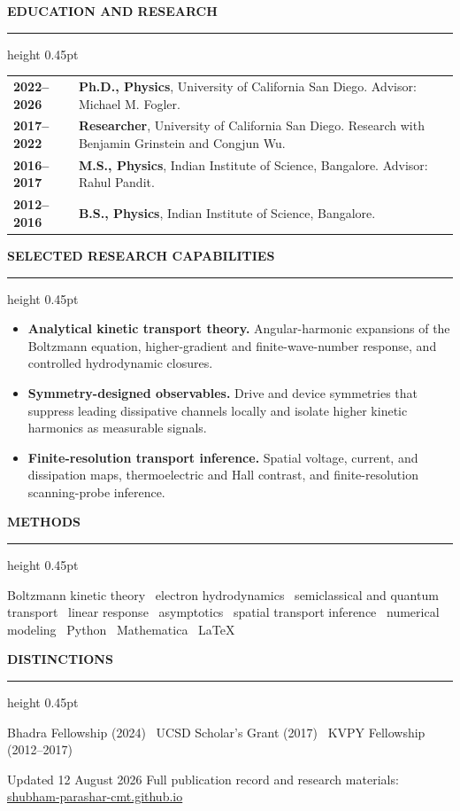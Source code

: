 \documentclass[10.5pt,a4paper]{article}
\newcommand{\sans}[1]{{\sffamily #1}}
\newcommand{\cvsection}[1]{%
  \vspace{11.5pt}%
  {\sans{\fontsize{9.1}{10}\selectfont\bfseries\color{accent}\MakeUppercase{#1}}}\par
  \vspace{2.4pt}\color{rule}\hrule height 0.45pt\color{ink}\vspace{5.4pt}
}
\begin{document}
\cvsection{Education and research}
\begin{tabularx}{\textwidth}{@{}>{\sffamily\bfseries}p{20mm} X@{}}
2022--2026 & \textbf{Ph.D., Physics}, University of California San Diego. Advisor: Michael M. Fogler.\\[3.4pt]
2017--2022 & \textbf{Researcher}, University of California San Diego. Research with Benjamin Grinstein and Congjun Wu.\\[3.4pt]
2016--2017 & \textbf{M.S., Physics}, Indian Institute of Science, Bangalore. Advisor: Rahul Pandit.\\[3.4pt]
2012--2016 & \textbf{B.S., Physics}, Indian Institute of Science, Bangalore.\\
\end{tabularx}

\cvsection{Selected research capabilities}
\begin{itemize}[leftmargin=1.15em,itemsep=6.0pt,topsep=0pt,parsep=0pt]
  \item \textbf{Analytical kinetic transport theory.} Angular-harmonic expansions of the Boltzmann equation, higher-gradient and finite-wave-number response, and controlled hydrodynamic closures.
  \item \textbf{Symmetry-designed observables.} Drive and device symmetries that suppress leading dissipative channels locally and isolate higher kinetic harmonics as measurable signals.
  \item \textbf{Finite-resolution transport inference.} Spatial voltage, current, and dissipation maps, thermoelectric and Hall contrast, and finite-resolution scanning-probe inference.
\end{itemize}

\cvsection{Methods}
Boltzmann kinetic theory \textperiodcentered\ electron hydrodynamics \textperiodcentered\ semiclassical and quantum transport \textperiodcentered\ linear response \textperiodcentered\ asymptotics \textperiodcentered\ spatial transport inference \textperiodcentered\ numerical modeling \textperiodcentered\ Python \textperiodcentered\ Mathematica \textperiodcentered\ LaTeX

\cvsection{Distinctions}
Bhadra Fellowship (2024) \textperiodcentered\ UCSD Scholar's Grant (2017) \textperiodcentered\ KVPY Fellowship (2012--2017)

\vfill
{\sans{\fontsize{7.8}{9}\selectfont\color{muted}Updated 12 August 2026 \hfill Full publication record and research materials: \href{https://shubham-parashar-cmt.github.io/}{shubham-parashar-cmt.github.io}}}
\end{document}
